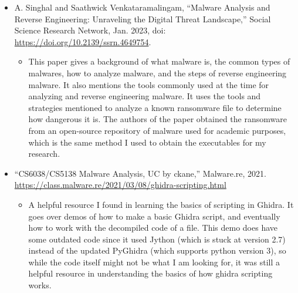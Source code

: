 \documentclass[12pt, a4paper]{article}
\begin{document}
    \begin{itemize}
        \item A. Singhal and Saathwick Venkataramalingam, “Malware Analysis and Reverse Engineering: Unraveling the Digital Threat Landscape,” 
        Social Science Research Network, Jan. 2023, doi: \url{https://doi.org/10.2139/ssrn.4649754}. 
        \begin{itemize}
            \item This paper gives a background of what malware is, the common types of malwares, how to analyze malware, and the steps of reverse engineering malware. 
            It also mentions the tools commonly used at the time for analyzing and reverse engineering malware. 
            It uses the tools and strategies mentioned to analyze a known ransomware file to determine how dangerous it is. 
            The authors of the paper obtained the ransomware from an open-source repository of malware used for academic purposes,
            which is the same method I used to obtain the executables for my research.
        \end{itemize}
    \end{itemize}
    \begin{itemize}
        \item “CS6038/CS5138 Malware Analysis, UC by ckane,” Malware.re, 2021. \url{https://class.malware.re/2021/03/08/ghidra-scripting.html} 
        \begin{itemize}
            \item A helpful resource I found in learning the basics of scripting in Ghidra. 
            It goes over demos of how to make a basic Ghidra script, and eventually how to work with the decompiled code of a file. 
            This demo does have some outdated code since it used Jython (which is stuck at version 2.7) 
            instead of the updated PyGhidra (which supports python version 3), so while the code itself might not be what I am looking for, 
            it was still a helpful resource in understanding the basics of how ghidra scripting works. 
        \end{itemize}
    \end{itemize}
\end{document}

